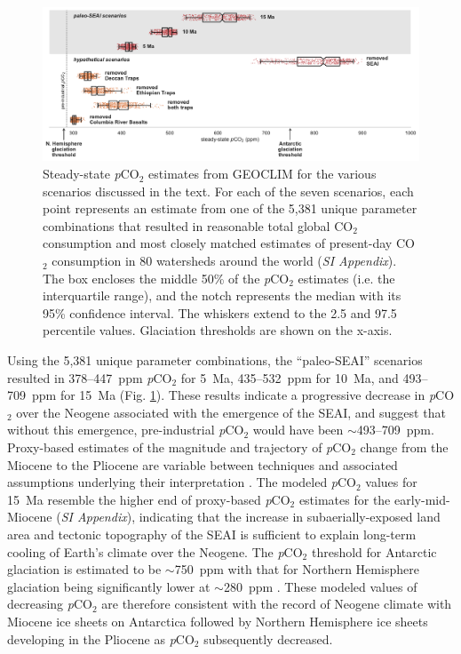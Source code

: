 \documentclass[9pt,twocolumn,twoside,lineno]{pnas-new}
\newcommand{\pCOtwo}{\textit{p}CO$_{2}$\xspace}
\newcommand{\COtwo}{CO$_{2}$\xspace}
\newcommand{\SI}{\textit{SI Appendix}\xspace}
\begin{document}
\begin{figure}[h]
    \centering
    \includegraphics[width=1\linewidth]{Figures/scenario_pCO2.pdf}
    \caption{Steady-state \pCOtwo estimates from GEOCLIM for the various scenarios discussed in the text. For each of the seven scenarios, each point represents an estimate from one of the 5,381 unique parameter combinations that resulted in reasonable total global \COtwo consumption and most closely matched estimates of present-day \COtwo consumption in 80 watersheds around the world (\SI). The box encloses the middle 50\% of the \pCOtwo estimates (i.e. the interquartile range), and the notch represents the median with its 95\% confidence interval. The whiskers extend to the 2.5 and 97.5 percentile values. Glaciation thresholds \cite{DeConto2008a} are shown on the x-axis.}
    \label{fig:scenario_pCO2}
\end{figure}

Using the 5,381 unique parameter combinations, the ``paleo-SEAI'' scenarios resulted in 378--447~ppm \pCOtwo for 5~Ma, 435--532~ppm for 10~Ma, and 493--709~ppm for 15~Ma (Fig. \ref{fig:scenario_pCO2}). These results indicate a progressive decrease in \pCOtwo over the Neogene associated with the emergence of the SEAI, and suggest that without this emergence, pre-industrial \pCOtwo would have been $\sim$493--709~ppm. Proxy-based estimates of the magnitude and trajectory of \pCOtwo change from the Miocene to the Pliocene are variable between techniques and associated assumptions underlying their interpretation \cite{Foster2017a}. The modeled \pCOtwo values for 15~Ma resemble the higher end of proxy-based \pCOtwo estimates for the early-mid-Miocene (\SI), indicating that the increase in subaerially-exposed land area and tectonic topography of the SEAI is sufficient to explain long-term cooling of Earth's climate over the Neogene. The \pCOtwo threshold for Antarctic glaciation is estimated to be $\sim$750~ppm with that for Northern Hemisphere glaciation being significantly lower at $\sim$280~ppm \cite{DeConto2008a}. These modeled values of decreasing \pCOtwo are therefore consistent with the record of Neogene climate with Miocene ice sheets on Antarctica \cite{Sugden1995a} followed by Northern Hemisphere ice sheets developing in the Pliocene \cite{Haug2005a} as \pCOtwo subsequently decreased.
\end{document}
